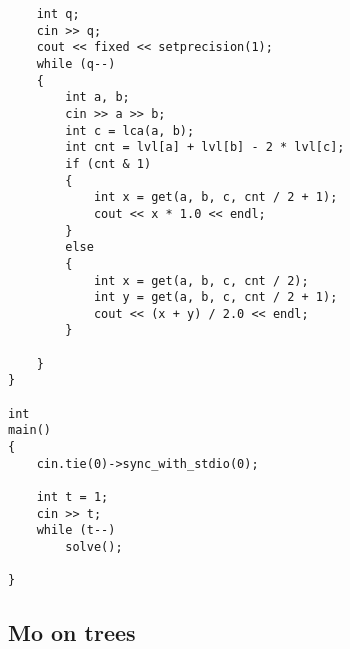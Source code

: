 \documentclass{article}
\begin{document}
\begin{verbatim}
	int q;
	cin >> q;
	cout << fixed << setprecision(1);
	while (q--)
	{
		int a, b;
		cin >> a >> b;
		int c = lca(a, b);
		int cnt = lvl[a] + lvl[b] - 2 * lvl[c];
		if (cnt & 1)
		{
			int x = get(a, b, c, cnt / 2 + 1);
			cout << x * 1.0 << endl;
		}
		else
		{
			int x = get(a, b, c, cnt / 2);
			int y = get(a, b, c, cnt / 2 + 1);
			cout << (x + y) / 2.0 << endl;
		}

	}
}

int
main()
{
	cin.tie(0)->sync_with_stdio(0);

	int t = 1;
	cin >> t;
	while (t--)
		solve();

}
\end{verbatim}

\subsection{Mo on trees}
\end{document}
